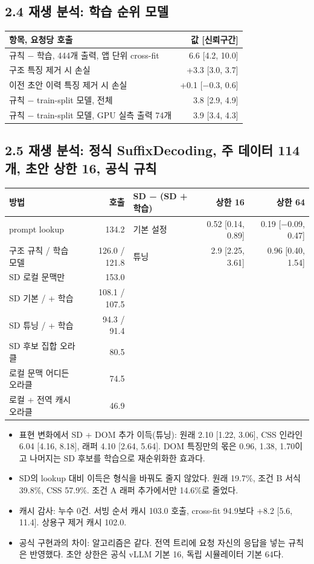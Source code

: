 \documentclass[10pt,a4paper]{article}
\begin{document}
\subsection*{2.4 재생 분석: 학습 순위 모델}
\begin{table}[H]\centering\small
\begin{tabular}{lr}
\toprule
항목, 요청당 호출 & 값 [신뢰구간]\\
\midrule
규칙 − 학습, 444개 출력, 앱 단위 cross-fit & 6.6 [4.2, 10.0]\\
구조 특징 제거 시 손실 & +3.3 [3.0, 3.7]\\
이전 초안 이력 특징 제거 시 손실 & +0.1 [−0.3, 0.6]\\
규칙 − train-split 모델, 전체 & 3.8 [2.9, 4.9]\\
규칙 − train-split 모델, GPU 실측 출력 74개 & 3.9 [3.4, 4.3]\\
\bottomrule
\end{tabular}
\end{table}

\subsection*{2.5 재생 분석: 정식 SuffixDecoding, 주 데이터 114개, 초안 상한 16, 공식 규칙}
\begin{table}[H]\centering\small
\begin{tabular}{lr@{\hspace{2.5em}}lrr}
\toprule
방법 & 호출 & SD − (SD + 학습) & 상한 16 & 상한 64\\
\midrule
prompt lookup & 134.2 & 기본 설정 & 0.52 [0.14, 0.89] & 0.19 [−0.09, 0.47]\\
구조 규칙 / 학습 모델 & 126.0 / 121.8 & 튜닝 & 2.9 [2.25, 3.61] & 0.96 [0.40, 1.54]\\
SD 로컬 문맥만 & 153.0 & & & \\
SD 기본 / + 학습 & 108.1 / 107.5 & & & \\
SD 튜닝 / + 학습 & 94.3 / 91.4 & & & \\
SD 후보 집합 오라클 & 80.5 & & & \\
로컬 문맥 어디든 오라클 & 74.5 & & & \\
로컬 + 전역 캐시 오라클 & 46.9 & & & \\
\bottomrule
\end{tabular}
\end{table}
\begin{itemize}[leftmargin=1.2em]
\item 표현 변화에서 SD + DOM 추가 이득(튜닝): 원래 2.10 [1.22, 3.06], CSS 인라인 6.04 [4.16, 8.18], 래퍼 4.10 [2.64, 5.64]. DOM 특징만의 몫은 0.96, 1.38, 1.70이고 나머지는 SD 후보를 학습으로 재순위화한 효과다.
\item SD의 lookup 대비 이득은 형식을 바꿔도 줄지 않았다. 원래 19.7\%, 조건 B 서식 39.8\%, CSS 57.9\%. 조건 A 래퍼 추가에서만 14.6\%로 줄었다.
\item 캐시 감사: 누수 0건. 서빙 순서 캐시 103.0 호출, cross-fit 94.9보다 +8.2 [5.6, 11.4]. 상용구 제거 캐시 102.0.
\item 공식 구현과의 차이: 알고리즘은 같다. 전역 트리에 요청 자신의 응답을 넣는 규칙은 반영했다. 초안 상한은 공식 vLLM 기본 16, 독립 시뮬레이터 기본 64다.
\end{itemize}
\end{document}

